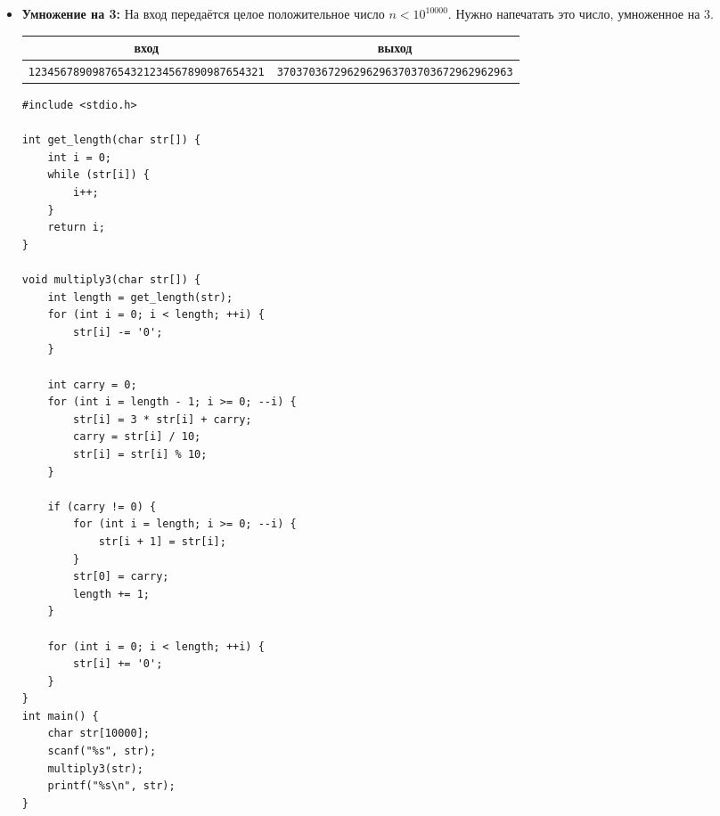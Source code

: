 \documentclass{article}
\begin{document}
\begin{itemize}
\begin{lstlisting}[backgroundcolor = \color{solcolor}]
#include <stdio.h>

void sort(char str[]) { 
    for (int i = 0; str[i]; ++i) {
    
        int min_index = i;
        for (int j = i; str[j]; ++j)
            if (str[j] < str[min_index])
                min_index = j;
                
        char temp = str[i];
        str[i] = str[min_index];
        str[min_index] = temp;
    }
}
int main() {
    char str[500];
    scanf("%[^\n]", str);
    sort(str);
    printf("%s\n", str);
    
}
\end{lstlisting}

\newpage
\item \textbf{Умножение на 3:} На вход передаётся целое положительное число $n < 10^{10000}$. Нужно напечатать это число, умноженное на 3.
\begin{center}
\begin{tabular}{ c | c }
 вход & выход \\ \hline
  \texttt{1234567890987654321234567890987654321} & \texttt{3703703672962962963703703672962962963} \\
\end{tabular}
\end{center}
\begin{lstlisting}[backgroundcolor = \color{solcolor}]
#include <stdio.h>

int get_length(char str[]) {
    int i = 0;
    while (str[i]) {
        i++;
    }
    return i;
}

void multiply3(char str[]) {
    int length = get_length(str);
    for (int i = 0; i < length; ++i) {
        str[i] -= '0';
    }
    
    int carry = 0;
    for (int i = length - 1; i >= 0; --i) {
        str[i] = 3 * str[i] + carry;
        carry = str[i] / 10;
        str[i] = str[i] % 10;
    }
    
    if (carry != 0) {
        for (int i = length; i >= 0; --i) {
            str[i + 1] = str[i];
        }
        str[0] = carry;
        length += 1;
    }
    
    for (int i = 0; i < length; ++i) {
        str[i] += '0';
    }
}
int main() {
    char str[10000];
    scanf("%s", str);
    multiply3(str);
    printf("%s\n", str);
}
\end{lstlisting}

\end{itemize}
\end{document}
